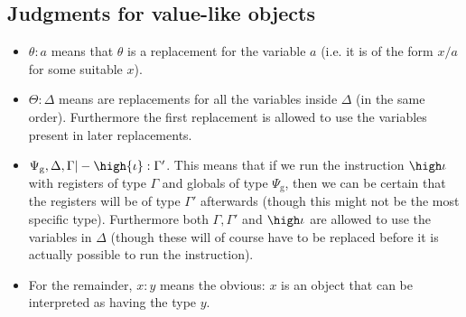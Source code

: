 \fbox{$\subtype{}{\phi}{\phi}$}

\fbox{$\subtype{\Delta}{\tau^\phi}{\tau^\phi}$}
\begin{mathpar}
\end{mathpar}

\fbox{$\subtype{\Delta}{\sigma}{\sigma}$}

\fbox{$\subtype{\Delta}{\Gamma}{\Gamma}$}
\begin{mathpar}
\end{mathpar}

\subsection{Judgments for value-like objects}

\begin{itemize}
\item $\theta : a$ means that $\theta$ is a replacement for the variable $a$
  (i.e. it is of the form $x / a$ for some suitable $x$).
\item $\Theta : \Delta$ means are replacements for all the variables inside
  $\Delta$ (in the same order). Furthermore the first replacement is allowed
  to use the variables present in later replacements.
\item $\Psi_{\mathrm{g}}, \Delta, \Gamma |- \high{\iota} : \Gamma'$. This means that if
  we run the instruction $\high \iota$ with registers of type $\Gamma$ and
  globals of type $\Psi_{\mathrm{g}}$, then we can be certain that the registers will be
  of type $\Gamma'$ afterwards (though this might not be the most specific
  type). Furthermore both $\Gamma, \Gamma'$ and $\high \iota$ are allowed to
  use the variables in $\Delta$ (though these will of course have to be
  replaced before it is actually possible to run the instruction).
\item For the remainder, $x : y$ means the obvious: $x$ is an object that can be
  interpreted as having the type $y$.
\end{itemize}

